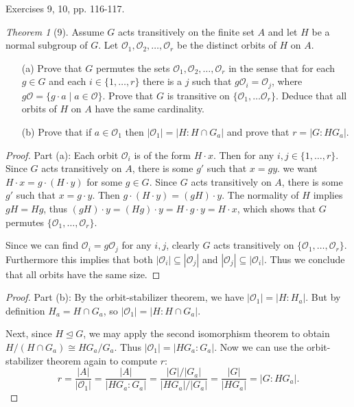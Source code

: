 \documentclass[12pt]{article}
\theoremstyle{remark}
\theoremstyle{named}
\newtheorem*{theorem}{Theorem}
\newcommand{\normal}{\trianglelefteq}
\begin{document}
Exercises 9, 10, pp. 116-117.

\begin{theorem}[9]
    Assume \(G\) acts transitively on the finite set \(A\) and let \(H\) be a normal subgroup of \(G\). Let \(\mathcal O_1, \mathcal O_2, \dots, \mathcal O_r\) be the distinct orbits of \(H\) on \(A\).

    \begin{enumerate}
        \item[(a)] Prove that \(G\) permutes the sets \(\mathcal O_1, \mathcal O_2, \dots, \mathcal O_r\) in the sense that for each \(g \in G\) and each \(i \in \{1, \dots, r\}\) there is a \(j\) such that \(g \mathcal O_i = \mathcal O_j\), where \(g \mathcal O = \{g \cdot a \mid a \in \mathcal O\}\). Prove that \(G\) is transitive on \(\{\mathcal O_1, \dots \mathcal O_r\}\). Deduce that all orbits of \(H\) on \(A\) have the same cardinality.
        
        \item[(b)] Prove that if \(a \in \mathcal O_1\) then \(|\mathcal O_1| = |H : H \cap G_a|\) and prove that \(r = |G : H G_a|\). 
    \end{enumerate}
\end{theorem}

\begin{proof}
    Part (a): Each orbit \(\mathcal O_i\) is of the form \(H \cdot x\). Then for any \(i, j \in \{1, \dots, r\}\). Since \(G\) acts transitively on \(A\), there is some \(g'\) such that \(x = gy\). we want \(H \cdot x = g \cdot (H \cdot y)\) for some \(g \in G\). Since \(G\) acts transitively on \(A\), there is some \(g'\) such that \(x = g \cdot y\). 
    Then \(g \cdot (H \cdot y) = (gH) \cdot y\). The normality of \(H\) implies \(gH = Hg\), thus \((gH) \cdot y = (Hg) \cdot y = H \cdot g \cdot y = H \cdot x\), which shows that \(G\) permutes \(\{\mathcal O_1, \dots, \mathcal O_r\}\). 

    Since we can find \(\mathcal O_i = g \mathcal O_j\) for any \(i, j\), clearly \(G\) acts transitively on \(\{\mathcal O_1, \dots, \mathcal O_r\}\). Furthermore this implies that both \(|\mathcal O_i| \subseteq |\mathcal O_j|\) and \(|\mathcal O_j| \subseteq |\mathcal O_i|\). Thus we conclude that all orbits have the same size.
\end{proof}

\begin{proof}
    Part (b): By the orbit-stabilizer theorem, we have \(|\mathcal O_1| = |H : H_a|\). But by definition \(H_a = H \cap G_a\), so \(|\mathcal O_1| = |H : H \cap G_a|\). 

    Next, since \(H \normal G\), we may apply the second isomorphism theorem to obtain \(H / (H \cap G_a) \cong HG_a / G_a\). Thus \(|\mathcal O_1| = |H G_a : G_a|\). Now we can use the orbit-stabilizer theorem again to compute \(r\):
    \[r = \frac{|A|}{|\mathcal O_1|} = \frac{|A|}{|H G_a : G_a|} = \frac{|G| /|G_a|}{|H G_a| / |G_a|} = \frac{|G|}{|HG_a|} = |G : H G_a|.\]
\end{proof}
\end{document}
